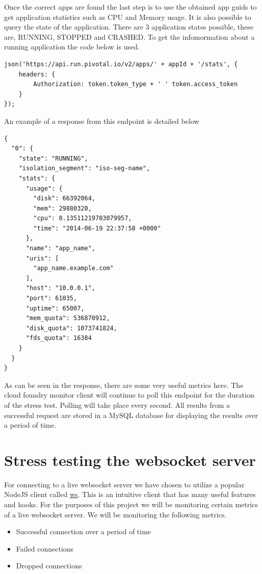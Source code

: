 Once the correct apps are found the last step is to use the obtained app guids to get application statistics such as CPU and Memory usage. It is also possible to query the state of the application. There are 3 application states possible, these are, RUNNING, STOPPED and CRASHED. To get the infomormation about a running application the code below is used. 

\begin{verbatim}
json('https://api.run.pivotal.io/v2/apps/' + appId + '/stats', {
    headers: {
        Authorization: token.token_type + ' ' token.access_token
    }
});
\end{verbatim}

An example of a response from this endpoint is detailed below

\begin{verbatim}
{
  "0": {
    "state": "RUNNING",
    "isolation_segment": "iso-seg-name",
    "stats": {
      "usage": {
        "disk": 66392064,
        "mem": 29880320,
        "cpu": 0.13511219703079957,
        "time": "2014-06-19 22:37:58 +0000"
      },
      "name": "app_name",
      "uris": [
        "app_name.example.com"
      ],
      "host": "10.0.0.1",
      "port": 61035,
      "uptime": 65007,
      "mem_quota": 536870912,
      "disk_quota": 1073741824,
      "fds_quota": 16384
    }
  }
}
\end{verbatim}

As can be seen in the response, there are some very useful metrics here. The cloud foundry monitor client will continue to poll this endpoint for the duration of the stress test. Polling will take place every second. All results from a successful request are stored in a MySQL database for displaying the results over a period of time.

\section{Stress testing the websocket server}

For connecting to a live websocket server we have chosen to utilize a popular NodeJS client called \href{https://www.npmjs.com/package/ws}{ws}. This is an intuitive client that has many useful features and hooks. For the purposes of this project we will be monitoring certain metrics of a live websocket server. We will be monitoring the following metrics.

\begin{itemize}
  \item Successful connection over a period of time
  \item Failed connections
  \item Dropped connections
\end{itemize}

